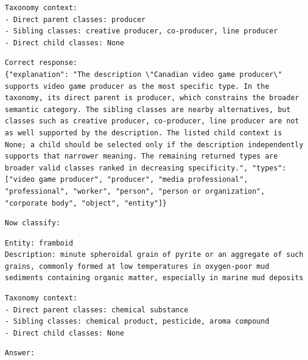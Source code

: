 \begin{Verbatim}[fontsize=\footnotesize,breaklines=true,breakanywhere=true]
Taxonomy context:
- Direct parent classes: producer
- Sibling classes: creative producer, co-producer, line producer
- Direct child classes: None
\end{Verbatim}

\begin{Verbatim}[fontsize=\footnotesize,breaklines=true,breakanywhere=true]
Correct response:
{"explanation": "The description \"Canadian video game producer\" supports video game producer as the most specific type. In the taxonomy, its direct parent is producer, which constrains the broader semantic category. The sibling classes are nearby alternatives, but classes such as creative producer, co-producer, line producer are not as well supported by the description. The listed child context is None; a child should be selected only if the description independently supports that narrower meaning. The remaining returned types are broader valid classes ranked in decreasing specificity.", "types": ["video game producer", "producer", "media professional", "professional", "worker", "person", "person or organization", "corporate body", "object", "entity"]}
\end{Verbatim}

\begin{Verbatim}[fontsize=\footnotesize,breaklines=true,breakanywhere=true]
Now classify:
\end{Verbatim}

\begin{Verbatim}[fontsize=\footnotesize,breaklines=true,breakanywhere=true]
Entity: framboid
Description: minute spheroidal grain of pyrite or an aggregate of such grains, commonly formed at low temperatures in oxygen-poor mud sediments containing organic matter, especially in marine mud deposits
\end{Verbatim}

\begin{Verbatim}[fontsize=\footnotesize,breaklines=true,breakanywhere=true]
Taxonomy context:
- Direct parent classes: chemical substance
- Sibling classes: chemical product, pesticide, aroma compound
- Direct child classes: None
\end{Verbatim}

\begin{Verbatim}[fontsize=\footnotesize,breaklines=true,breakanywhere=true]
Answer:
\end{Verbatim}

\clearpage


